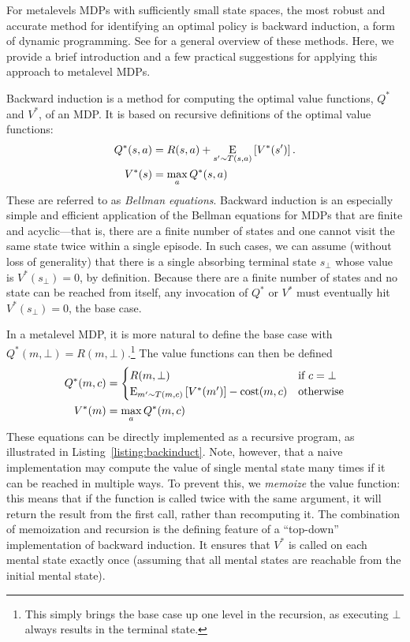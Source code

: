 For metalevels MDPs with sufficiently small state spaces, the most robust and accurate method for identifying an optimal policy is backward induction, a form of dynamic programming. See \citet{puterman2014markov} for a general overview of these methods. Here, we provide a brief introduction and a few practical suggestions for applying this approach to metalevel MDPs.

Backward induction is a method for computing the optimal value functions, $Q^*$ and $V^*$, of an MDP. It is based on recursive definitions of the optimal value functions:
\begin{equation}\label{eq:value-recursive}
\begin{aligned}
    Q^*(s, a) &= R(s, a) + \expectunder{V^*(s')}{s' \sim T(s,a)}.\\
    V^*(s) &= \max_a Q^*(s, a)
\end{aligned}
\end{equation}
These are referred to as \emph{Bellman equations}. Backward induction is an especially simple and efficient application of the Bellman equations for MDPs that are finite and acyclic---that is, there are a finite number of states and one cannot visit the same state twice within a single episode. In such cases, we can assume (without loss of generality) that there is a single absorbing terminal state $s_\bot$ whose value is $V^*(s_\bot) = 0$, by definition. Because there are a finite number of states and no state can be reached from itself, any invocation of $Q^*$ or $V^*$ must eventually hit $V^*(s_\bot) = 0$, the base case.

In a metalevel MDP, it is more natural to define the base case with $Q^*(m, \bot) = R(m, \bot)$.\footnote{%
  This simply brings the base case up one level in the recursion, as executing $\bot$ always results in the terminal state.
} The value functions can then be defined
\begin{equation}\label{eq:value-recursive-meta}
\begin{aligned}
    Q^*(m, c) &= \begin{cases}
      R(m, \bot) &\text{if } c = \bot \\
      \expectunder{V^*(m')}{m' \sim T(m,c)} - \cost(m, c) &\text{otherwise}
    \end{cases} \\
    V^*(m) &= \max_a Q^*(m, c)
\end{aligned}
\end{equation}
These equations can be directly implemented as a recursive program, as illustrated in Listing~\ref{listing:backinduct}. Note, however, that a naive implementation may compute the value of single mental state many times if it can be reached in multiple ways. To prevent this, we \emph{memoize} the value function: this means that if the function is called twice with the same argument, it will return the result from the first call, rather than recomputing it. The combination of memoization and recursion is the defining feature of a ``top-down'' implementation of backward induction. It ensures that $V^*$ is called on each mental state exactly once (assuming that all mental states are reachable from the initial mental state).


